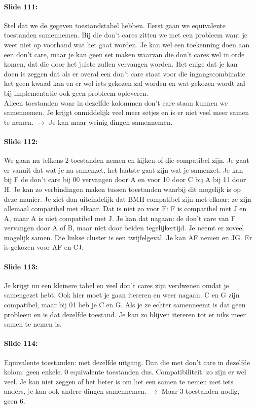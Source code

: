 \documentclass[10pt,a4paper]{book}
\begin{document}
\paragraph{Slide 111:} Stel dat we de gegeven toestandstabel hebben. Eerst gaan we equivalente toestanden samennemen. Bij die don't cares zitten we met een probleem want je weet niet op voorhand wat het gaat worden. Je kan wel een toekenning doen aan een don't care, maar je kan geen set maken waarvan die don't cares wel in orde komen, dat die door het juiste zullen vervangen worden. Het enige dat je kan doen is zeggen dat als er overal een don't care staat voor die ingangscombinatie het geen kwaad kan en er wel iets gekozen zal worden en wat gekozen wordt zal bij implementatie ook geen probleem opleveren.\\
Alleen toestanden waar in dezelfde kolommen don't care staan kunnen we samennemen. Je krijgt onmiddelijk veel meer setjes en is er niet veel meer samen te nemen.  $\rightarrow$ Je kan maar weinig dingen samennemen.

\paragraph{Slide 112:} We gaan nu telkens 2 toestanden nemen en kijken of die compatibel zijn. Je gaat er vanuit dat wat je nu samenzet, het laatste gaat zijn wat je samenzet. Je kan bij F de don't care bij 00 vervangen door A en voor 10 door C bij A bij 11 door H. Je kan zo verbindingen maken tussen toestanden waarbij dit mogelijk is op deze manier. Je ziet dan uiteindelijk dat BMH compatibel zijn met elkaar: ze zijn allemaal compatibel met elkaar. Dat is niet zo voor F: F is compatibel met J en A, maar A is niet compatibel met J. Je kan dat nagaan: de don't care van F vervangen door A of B, maar niet door beiden tegelijkertijd.
Je neemt er zoveel mogelijk samen. Die linkse cluster is een twijfelgeval. Je kan AF nemen en JG. Er is gekozen voor AF en CJ. 

\paragraph{Slide 113:} Je krijgt nu een kleinere tabel en veel don't cares zijn verdwenen omdat je samengezet hebt. Ook hier moet je gaan itereren en weer nagaan. C en G zijn compatibel, maar bij 01 heb je C en G. Als je ze echter samenneemt is dat geen probleem en is dat dezelfde toestand. Je kan zo blijven itereren tot er niks meer samen te nemen is.

\paragraph{Slide 114:} Equivalente toestanden: met dezelfde uitgang. Dan die met don't care in dezelfde kolom: geen enkele. 0 equivalente toestanden dus. Compatibiliteit: zo zijn er wel veel. Je kan niet zeggen of het beter is om het een samen te nemen met iets anders, je kan ook andere dingen samennemen. $\rightarrow$ Maar 3 toestanden nodig, geen 6.
\end{document}
